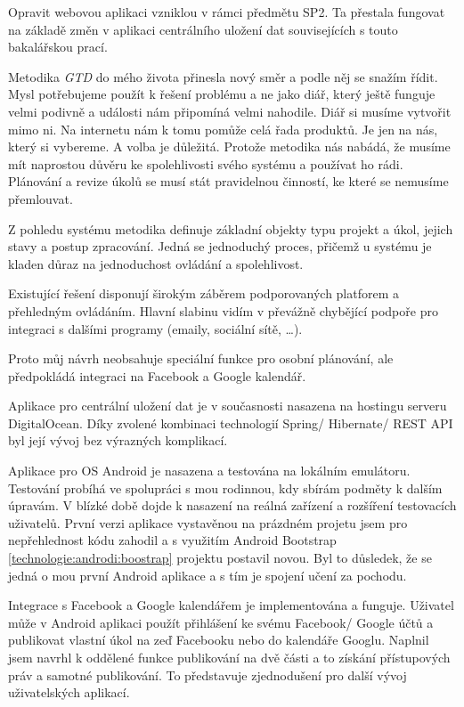 \documentclass[thesis=B,czech]{FITthesis}[2012/06/26]
\newcommand{\GTD}{\textit{GTD }}
\begin{document}
Opravit webovou aplikaci vzniklou v rámci předmětu SP2. Ta přestala fungovat na základě změn v aplikaci centrálního uložení dat souvisejících s touto bakalářskou prací.

\begin{conclusion}

Metodika \GTD do mého života přinesla nový směr a podle něj se snažím řídit. Mysl potřebujeme použít k řešení problému a ne jako diář, který ještě funguje velmi podivně a události nám připomíná velmi nahodile. Diář si musíme vytvořit mimo ni. Na internetu nám k tomu pomůže celá řada produktů. Je jen na nás, který si vybereme. A volba je důležitá. Protože metodika nás nabádá, že musíme mít naprostou důvěru ke spolehlivosti svého systému a používat ho rádi. Plánování a revize úkolů se musí stát pravidelnou činností, ke které se nemusíme přemlouvat.

Z pohledu systému metodika definuje základní objekty typu projekt a úkol, jejich stavy a postup zpracování. Jedná se jednoduchý proces, přičemž u systému je kladen důraz na jednoduchost ovládání a spolehlivost. 

Existující řešení disponují širokým záběrem podporovaných platforem a přehledným ovládáním. Hlavní slabinu vidím v převážně chybějící podpoře pro integraci s dalšími programy (emaily, sociální sítě, \dots).

Proto můj návrh neobsahuje speciální funkce pro osobní plánování, ale předpokládá integraci na Facebook a Google kalendář.

Aplikace pro centrální uložení dat je v současnosti nasazena na hostingu serveru DigitalOcean. Díky zvolené kombinaci technologií Spring/ Hibernate/ REST API byl její vývoj bez výrazných komplikací.

Aplikace pro OS Android je nasazena a testována na lokálním emulátoru. Testování probíhá ve spolupráci s mou rodinnou, kdy sbírám podměty k dalším úpravám. V blízké době dojde k nasazení na reálná zařízení a rozšíření testovacích uživatelů. První verzi aplikace vystavěnou na prázdném projetu jsem pro nepřehlednost kódu zahodil a s využitím Android Bootstrap \ref{technologie:androdi:boostrap} projektu postavil novou. Byl to důsledek, že se jedná o mou první Android aplikace a s tím je spojení učení za pochodu.      

Integrace s Facebook a Google kalendářem je implementována a funguje. Uživatel může v Android aplikaci použít přihlášení ke svému Facebook/ Google účtů a publikovat vlastní úkol na zeď Facebooku nebo do kalendáře Googlu. Naplnil jsem navrhl k oddělené funkce publikování na dvě části a to získání přístupových práv a samotné publikování. To představuje zjednodušení pro další vývoj uživatelských aplikací.


\end{conclusion}
\end{document}
